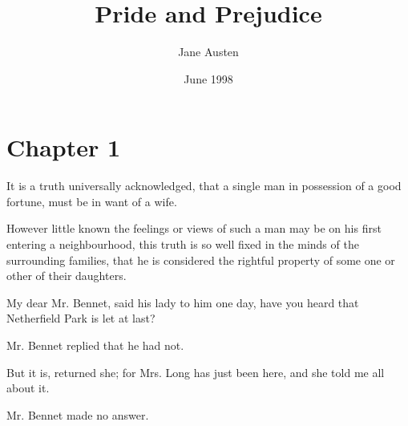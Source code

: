 \documentclass[DIV=6]{scrartcl}
\title{Pride and Prejudice}
\author{Jane Austen}
\date{June 1998}
\begin{document}
\maketitle






















\section{Chapter 1}


It is a truth universally acknowledged, that a single man in possession
of a good fortune, must be in want of a wife.

However little known the feelings or views of such a man may be on his
first entering a neighbourhood, this truth is so well fixed in the minds
of the surrounding families, that he is considered the rightful property
of some one or other of their daughters.

My dear Mr. Bennet, said his lady to him one day, have you heard that
Netherfield Park is let at last?

Mr. Bennet replied that he had not.

But it is, returned she; for Mrs. Long has just been here, and she
told me all about it.

Mr. Bennet made no answer.
\end{document}
